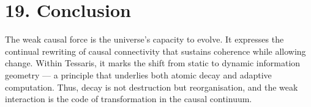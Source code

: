 \documentclass[11pt,a4paper]{article}
\begin{document}
\section{19. Conclusion}
The weak causal force is the universe’s capacity to evolve.  
It expresses the continual rewriting of causal connectivity that sustains coherence while allowing change.  
Within Tessaris, it marks the shift from static to dynamic information geometry — a principle that underlies both atomic decay and adaptive computation.  
Thus, decay is not destruction but reorganisation, and the weak interaction is the code of transformation in the causal continuum.
\end{document}
